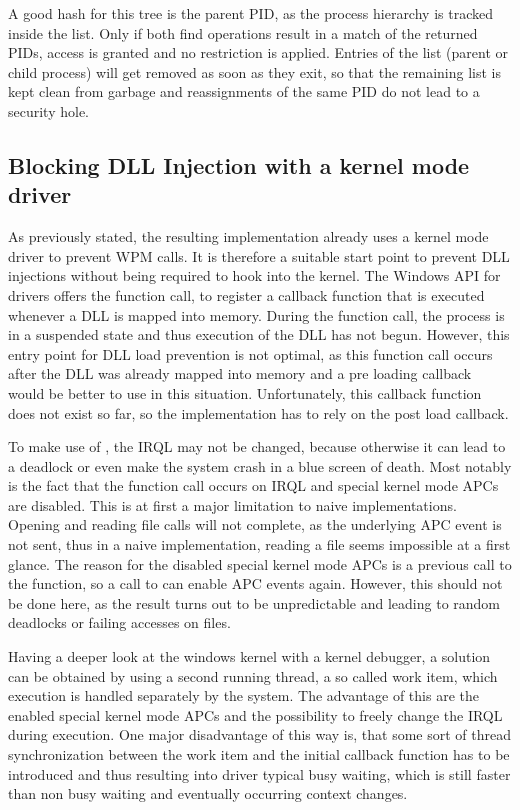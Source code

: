 A good hash for this tree is the parent \gls{PID}, as the process hierarchy is tracked inside the list. Only if both find operations result in a match of the returned \glspl{PID}, access is granted and no restriction is applied. Entries of the list (parent or child process) will get removed as soon as they exit, so that the remaining list is kept clean from garbage and reassignments of the same \gls{PID} do not lead to a security hole.

\subsection{Blocking DLL Injection with a kernel mode driver}
As previously stated, the resulting implementation already uses a kernel mode driver to prevent \gls{WPM} calls. It is therefore a suitable start point to prevent \gls{DLL} injections without being required to hook into the kernel. The Windows \gls{API} for drivers offers the  function call, to register a callback function that is executed whenever a \gls{DLL} is mapped into memory. During the function call, the process is in a suspended state and thus execution of the \gls{DLL} has not begun. However, this entry point for \gls{DLL} load prevention is not optimal, as this function call occurs after the \gls{DLL} was already mapped into memory and a pre loading callback would be better to use in this situation. Unfortunately, this callback function does not exist so far, so the implementation has to rely on the post load callback.

To make use of , the \gls{IRQL} may not be changed, because otherwise it can lead to a deadlock or even make the system crash in a blue screen of death. Most notably is the fact that the function call occurs on \gls{IRQL}  and special kernel mode \glspl{APC} are disabled. This is at first a major limitation to naive implementations. Opening and reading file calls will not complete, as the underlying \gls{APC} event is not sent, thus in a naive implementation, reading a file seems impossible at a first glance. The reason for the disabled special kernel mode \glspl{APC} is a previous call to the  function, so a call to  can enable \gls{APC} events again. However, this should not be done here, as the result turns out to be unpredictable and leading to random deadlocks or failing accesses on files.

Having a deeper look at the windows kernel with a kernel debugger, a solution can be obtained by using a second running thread, a so called work item, which execution is handled separately by the system. The advantage of this are the enabled special kernel mode \glspl{APC} and the possibility to freely change the \gls{IRQL} during execution. One major disadvantage of this way is, that some sort of thread synchronization between the work item and the initial callback function has to be introduced and thus resulting into driver typical busy waiting, which is still faster than non busy waiting and eventually occurring context changes. 

